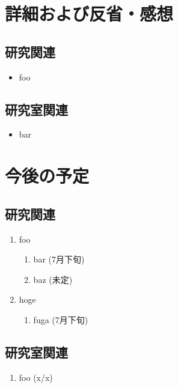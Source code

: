 \documentclass[fleqn, 12pt]{extarticle}
\begin{document}
\begin{spacing}{1.2}
  \section{詳細および反省・感想}
  \label{sec3}

  \subsection{研究関連}
  \label{sec3-1}
  \begin{itemize}
  \item[(\ref{sec2-2-enum3})]
    foo
  \end{itemize}

  \subsection{研究室関連}
  \label{sec3-2}
  \begin{itemize}
  \item[(\ref{sec2-2-enum3})]
    bar
  \end{itemize}

  \section{今後の予定}
  \label{sec4}
  \subsection{研究関連}
  \label{sec4-1}
  \begin{enumerate}
  \item foo
    \begin{enumerate}
    \item bar
      \hfill
      \label{sec2-1-1-enum1}
      (7月下旬)
    \item baz
      \hfill
      \label{sec2-1-1-enum2}
      (未定)
    \end{enumerate}
  \item hoge
    \begin{enumerate}
    \item fuga
      \hfill
      \label{sec2-1-2-enum2}
      (7月下旬)
    \end{enumerate}
  \end{enumerate}



  \subsection{研究室関連}
  \label{sec4-2}
  \begin{enumerate}
  \item foo
    \hfill
    \label{sec2-2-enum13}
    (x/x)
  \end{enumerate}
\end{spacing}
\end{document}
